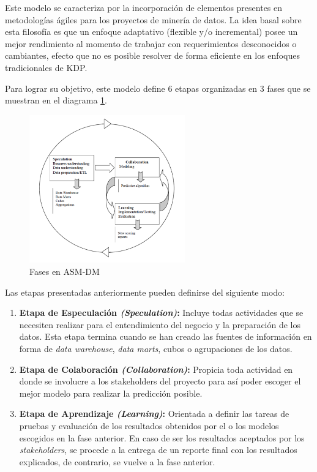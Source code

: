 Este modelo se caracteriza por la incorporación de elementos presentes en metodologías ágiles para los proyectos de minería de datos. La idea basal sobre esta filosofía es que un enfoque adaptativo (flexible y/o incremental) posee un mejor rendimiento al momento de trabajar con requerimientos desconocidos o cambiantes, efecto que no es posible resolver de forma eficiente en los enfoques tradicionales de KDP.

Para lograr su objetivo, este modelo \cite{knowledge_discovery} define 6 etapas organizadas en 3 fases que se muestran en el diagrama \ref{fig:adm_dm_phases}.

\begin{figure}[ht]
  \begin{center}
  \includegraphics[width=0.6\textwidth]{./figures/chapter_02/16_asm_dm_process_model_phases.png}
  \caption{Fases en ASM-DM}
  \label{fig:adm_dm_phases}
  \end{center}
\end{figure}

Las etapas presentadas anteriormente pueden definirse del siguiente modo:

\begin{enumerate}
  \item \textbf{Etapa de Especulación \textit{(Speculation)}:} Incluye todas actividades que se necesiten realizar para el entendimiento del negocio y la preparación de los datos. Esta etapa termina cuando se han creado las fuentes de información en forma de \textit{data warehouse}, \textit{data marts}, cubos o agrupaciones de los datos.
  \item \textbf{Etapa de Colaboración \textit{(Collaboration)}:} Propicia toda actividad en donde se involucre a los stakeholders del proyecto para así poder escoger el mejor modelo para realizar la predicción posible.
  \item \textbf{Etapa de Aprendizaje \textit{(Learning)}:} Orientada a definir las tareas de pruebas y evaluación de los resultados obtenidos por el o los modelos escogidos en la fase anterior. En caso de ser los resultados aceptados por los \textit{stakeholders}, se procede a la entrega de un reporte final con los resultados explicados, de contrario, se vuelve a la fase anterior.
\end{enumerate}

